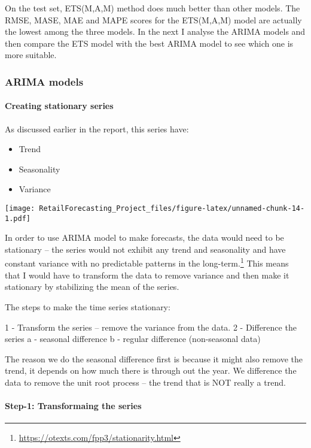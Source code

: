 \documentclass[
]{article}
\providecommand{\tightlist}{%
  \setlength{\itemsep}{0pt}\setlength{\parskip}{0pt}}
\begin{document}
On the test set, ETS(M,A,M) method does much better than other models.
The RMSE, MASE, MAE and MAPE scores for the ETS(M,A,M) model are
actually the lowest among the three models. In the next I analyse the
ARIMA models and then compare the ETS model with the best ARIMA model to
see which one is more suitable.

\hypertarget{arima-models}{%
\subsubsection{ARIMA models}\label{arima-models}}

\hypertarget{creating-stationary-series}{%
\paragraph{Creating stationary
series}\label{creating-stationary-series}}

As discussed earlier in the report, this series have:

\begin{itemize}
\tightlist
\item
  Trend
\item
  Seasonality
\item
  Variance
\end{itemize}

\texttt{[image: RetailForecasting\_Project\_files/figure-latex/unnamed-chunk-14-1.pdf]}

In order to use ARIMA model to make forecasts, the data would need to be
stationary -- the series would not exhibit any trend and seasonality and
have constant variance with no predictable patterns in the
long-term.\footnote{\url{https://otexts.com/fpp3/stationarity.html}}
This means that I would have to transform the data to remove variance
and then make it stationary by stabilizing the mean of the series.

The steps to make the time series stationary:

1 - Transform the series -- remove the variance from the data. 2 -
Difference the series a - seasonal difference b - regular difference
(non-seasonal data)

The reason we do the seasonal difference first is because it might also
remove the trend, it depends on how much there is through out the year.
We difference the data to remove the unit root process -- the trend that
is NOT really a trend.

\hypertarget{step-1-transformaing-the-series}{%
\paragraph{Step-1: Transformaing the
series}\label{step-1-transformaing-the-series}}
\end{document}

